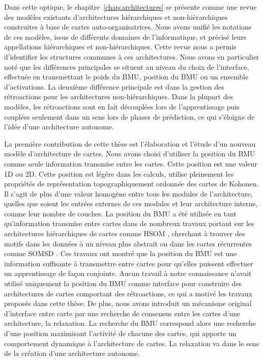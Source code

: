 Dans cette optique, le chapitre~\ref{chap:architectures} se présente comme une revue des modèles existants d'architectures hiérarchiques et non-hiérarchiques construites à base de cartes auto-organisatrices. Nous avons unifié les notations de ces modèles, issus de différents domaines de l'informatique, et précisé leurs appellations hiérarchiques et non-hiérarchiques. 
Cette revue nous a permis d'identifier les structures communes à ces architectures. Nous avons en particulier noté que les différences principales se situent au niveau du choix de l'interface, effectuée en transmettant le poids du BMU, position du BMU ou un ensemble d'activations. 
La deuxième différence principale est dans la gestion des rétroactions pour les architectures non-hiérarchiques.  Dans la plupart des modèles, les rétroactions sont en fait découplées lors de l'apprentissage puis couplées seulement dans un sens lors de phases de prédiction, ce qui s'éloigne de l'idée d'une architecture autonome.


La première contribution de cette thèse est l'élaboration et l'étude d'un nouveau modèle d'architecture de cartes.
Nous avons choisi d'utiliser la position du BMU comme seule information transmise entre les cartes. Cette position est une valeur 1D ou 2D. Cette position est légère dans les calculs, utilise pleinement les propriétés de représentation topographiquement ordonnée des cartes de Kohonen. Il s'agit de plus d'une valeur homogène entre tous les modules de l'architecture, quelles que soient les entrées externes de ces modules et leur architecture interne, comme leur nombre de couches.
La position du BMU a été utilisée en tant qu'information transmise entre cartes dans de nombreux travaux portant sur les architectures hiérarchiques de cartes comme HSOM \parencite{lampinen_clustering_1992}, cherchant à trouver des motifs dans les données à un niveau plus abstrait ou dans les cartes récurrentes comme SOMSD \parencite{hagenbuchner_self-organizing_2003}. 
Ces travaux ont montré que la position du BMU est une information suffisante à transmettre entre cartes pour qu'elles puissent effectuer un apprentissage de façon conjointe.
Aucun travail à notre connaissance n'avait utilisé uniquement la position du BMU comme interface pour construire des architectures de cartes comportant des rétroactions, ce qui a motivé les travaux proposés dans cette thèse.
De plus, nous avons introduit un mécanisme original d'interface entre carte par une recherche de consensus entre les cartes d'une architecture, la relaxation. La recherche du BMU correspond alors une recherche d'une position maximisant l'activité de chacune des cartes, qui apporte un comportement dynamique à l'architecture de cartes. La relaxation va dans le sens de la création d'une architecture autonome.

